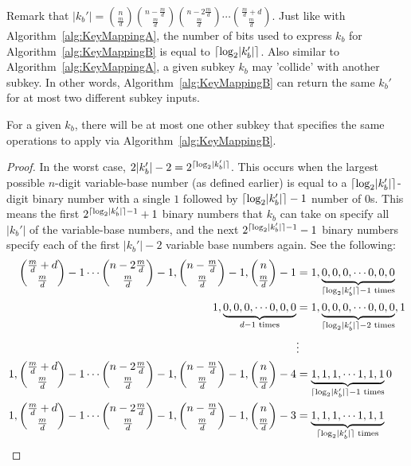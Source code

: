 Remark that $\lvert k_b' \rvert = {n \choose \frac{m}{d}}{n - \frac{m}{d} \choose \frac{m}{d}}{n - 2\frac{m}{d} \choose \frac{m}{d}}\cdots{\frac{m}{d} + d \choose \frac{m}{d}}$. Just like with Algorithm~\ref{alg:KeyMappingA}, the number of bits used to express $k_b$ for Algorithm~\ref{alg:KeyMappingB} is equal to $\lceil\log_2 \lvert k_b' \rvert\rceil$. Also similar to Algorithm~\ref{alg:KeyMappingA}, a given subkey $k_b$ may 'collide' with another subkey. In other words, Algorithm~\ref{alg:KeyMappingB} can return the same $k_b'$ for at most two different subkey inputs.
\begin{theorem}
\label{theorem:collisionForMappingB}
For a given $k_b$, there will be at most one other subkey that specifies the same operations to apply via Algorithm~\ref{alg:KeyMappingB}.
\end{theorem}
\begin{proof}
In the worst case, $2\lvert k_b' \rvert - 2 = 2^{\lceil\log_2 \lvert k_b' \rvert\rceil}$. This occurs when the largest possible $n$-digit variable-base number (as defined earlier) is equal to a $\lceil\log_2 \lvert k_b' \rvert\rceil$-digit binary number with a single $1$ followed by $\lceil\log_2 \lvert k_b' \rvert\rceil - 1$ number of $0$s. This means the first $2^{\lceil\log_2 \lvert k_b' \rvert\rceil - 1} + 1$ binary numbers that $k_b$ can take on specify all $\lvert k_b' \rvert$ of the variable-base numbers, and the next $2^{\lceil\log_2 \lvert k_b' \rvert\rceil - 1} - 1$ binary numbers specify each of the first $\lvert k_b' \rvert - 2$ variable base numbers again. See the following:
\begin{align}
{\frac{m}{d} + d \choose \frac{m}{d}} - 1 \cdots {n - 2\frac{m}{d} \choose \frac{m}{d}} - 1, {n - \frac{m}{d} \choose \frac{m}{d}} - 1, {n \choose \frac{m}{d}} - 1 &= 1, \underbrace{0, 0, 0, \cdots 0,0,0}_{\lceil\log_2 \lvert k_b' \rvert\rceil - 1 \text{ times}}\\
1,\underbrace{0, 0, 0, \cdots 0,0,0}_{d - 1 \text{ times}} &= 1, \underbrace{0, 0, 0, \cdots 0,0,0}_{\lceil\log_2 \lvert k_b' \rvert\rceil - 2 \text{ times}}, 1\\
& \vdots \nonumber \\
1,{\frac{m}{d} + d \choose \frac{m}{d}} - 1 \cdots {n - 2\frac{m}{d} \choose \frac{m}{d}} - 1, {n - \frac{m}{d} \choose \frac{m}{d}} - 1, {n \choose \frac{m}{d}} - 4 &= \underbrace{1, 1, 1, \cdots 1,1,1}_{\lceil\log_2 \lvert k_b' \rvert\rceil -1\text{ times}} 0 \\
1,{\frac{m}{d} + d \choose \frac{m}{d}} - 1 \cdots {n - 2\frac{m}{d} \choose \frac{m}{d}} - 1, {n - \frac{m}{d} \choose \frac{m}{d}} - 1, {n \choose \frac{m}{d}} - 3 &= \underbrace{1, 1, 1, \cdots 1,1,1}_{\lceil\log_2 \lvert k_b' \rvert\rceil\text{ times}}
\end{align}
\end{proof}


